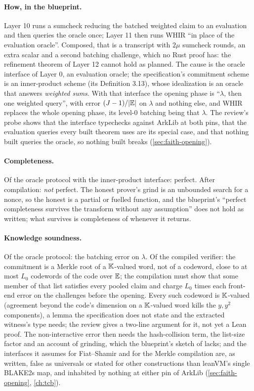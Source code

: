 \paragraph{How, in the blueprint.} Layer 10 runs a sumcheck reducing the batched weighted claim
to an evaluation and then queries the oracle once; Layer 11 then runs WHIR \enquote{in place of
the evaluation oracle}. Composed, that is a transcript with $2\mu$ sumcheck rounds, an extra
scalar and a second batching challenge, which no Rust proof has: the refinement theorem of
Layer 12 cannot hold as planned. The cause is the oracle interface of Layer 0, an evaluation
oracle; the specification's commitment scheme is an inner-product scheme (its Definition 3.13),
whose idealization is an oracle that answers \emph{weighted sums}. With that interface the
opening phase is \enquote{$\lambda$, then one weighted query}, with error $(J - 1)/\lvert \mathbb{E}\rvert$
on $\lambda$ and nothing else, and WHIR replaces the whole opening phase, its level-0 batching
being that $\lambda$. The review's probe shows that the interface typechecks against ArkLib at
both pins, that the evaluation queries every built theorem uses are its special case, and that
nothing built queries the oracle, so nothing built breaks (\cref{sec:faith-opening}).

\paragraph{Completeness.} Of the oracle protocol with the inner-product interface: perfect.
After compilation: \emph{not} perfect. The honest prover's grind is an unbounded search for a
nonce, so the honest  is a partial or fuelled function, and the blueprint's
\enquote{perfect completeness survives the transform without any assumption} does not hold as
written; what survives is completeness of  whenever it returns.

\paragraph{Knowledge soundness.} Of the oracle protocol: the batching error on $\lambda$. Of
the compiled verifier: the commitment is a Merkle root of a $\mathbb{K}$-valued word, not of a
codeword, close to at most $L_0$ codewords of the code over $\mathbb{E}$; the compilation must show
that some member of that list satisfies every pooled claim and charge $L_0$ times each
front-end error on the challenges before the opening. Every such codeword is $\mathbb{K}$-valued
(agreement beyond the code's dimension on a $\mathbb{K}$-valued word kills the $y, y^2$ components), a
lemma the specification does not state and the extracted witness's type needs; the review
gives a two-line argument for it, not yet a Lean proof. The non-interactive error then needs the hash-collision term, the
list-size factor and an account of grinding, which the blueprint's sketch of 
lacks; and the interfaces it assumes for Fiat--Shamir and for the Merkle compilation are, as
written, false as universals or stated for other constructions than leanVM's single BLAKE2s
map, and inhabited by nothing at either pin of ArkLib (\cref{sec:faith-opening},
\cref{ch:tcb}).

